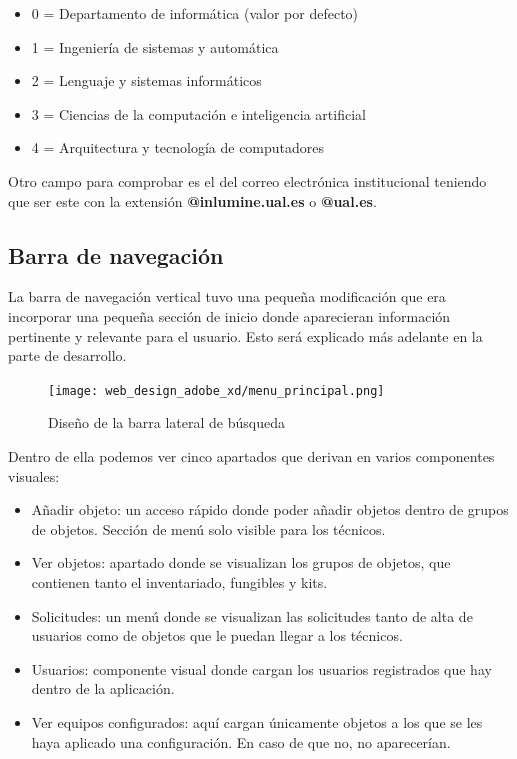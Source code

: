 \begin{itemize}
    \item 0 = Departamento de informática (valor por defecto)
    \item 1 = Ingeniería de sistemas y automática
    \item 2 = Lenguaje y sistemas informáticos
    \item 3 = Ciencias de la computación e inteligencia artificial
    \item 4 = Arquitectura y tecnología de computadores
\end{itemize}

Otro campo para comprobar es el del correo electrónica institucional teniendo que ser este con la extensión \textbf{@inlumine.ual.es} o \textbf{@ual.es}.

\subsection{Barra de navegación}

La barra de navegación vertical tuvo una pequeña modificación que era incorporar una pequeña sección de inicio donde aparecieran información pertinente y relevante para el usuario. Esto será explicado más adelante en la parte de desarrollo.

\begin{figure}[H]
    \begin{center}
        \texttt{[image: web\_design\_adobe\_xd/menu\_principal.png]}
        \caption{Diseño de la barra lateral de búsqueda}
    \end{center}
\end{figure}

Dentro de ella podemos ver cinco apartados que derivan en varios componentes visuales:

\begin{itemize}
    \item Añadir objeto: un acceso rápido donde poder añadir objetos dentro de grupos de objetos. Sección de menú solo visible para los técnicos.
    \item Ver objetos: apartado donde se visualizan los grupos de objetos, que contienen tanto el inventariado, fungibles y kits.
    \item Solicitudes: un menú donde se visualizan las solicitudes tanto de alta de usuarios como de objetos que le puedan llegar a los técnicos.
    \item Usuarios: componente visual donde cargan los usuarios registrados que hay dentro de la aplicación.
    \item Ver equipos configurados: aquí cargan únicamente objetos a los que se les haya aplicado una configuración. En caso de que no, no aparecerían.
\end{itemize}

